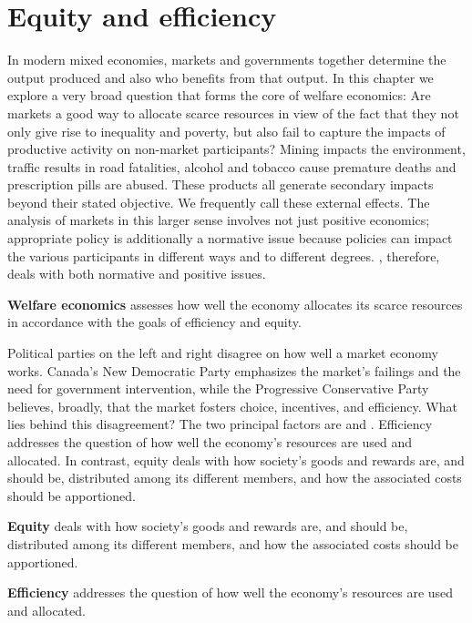 \section{Equity and efficiency}\label{sec:ch5sec1}

In modern mixed economies, markets and governments together determine the output produced and also who benefits from that output. In this chapter we explore a very broad question that forms the core of welfare economics: Are markets a good way to allocate scarce resources in view of the fact that they not only give rise to inequality and poverty, but also fail to capture the impacts of productive activity on non-market participants? Mining impacts the environment, traffic results in road fatalities, alcohol and tobacco cause premature deaths and prescription pills are abused. These products all generate secondary impacts beyond their stated objective. We frequently call these external effects. The analysis of markets in this larger sense involves not just positive economics; appropriate policy is additionally a normative issue because policies can impact the various participants in different ways and to different degrees. , therefore, deals with both normative and positive issues.

\begin{DefBox}
\textbf{Welfare economics} assesses how well the economy allocates its scarce resources in accordance with the goals of efficiency and equity.
\end{DefBox}

Political parties on the left and right disagree on how well a market economy works. Canada's New Democratic Party emphasizes the market's failings and the need for government intervention, while the Progressive Conservative Party believes, broadly, that the market fosters choice, incentives, and efficiency. What lies behind this disagreement? The two principal factors are  and . Efficiency addresses the question of how well the economy's resources are used and allocated. In contrast, equity deals with how society's goods and rewards are, and should be, distributed among its different members, and how the associated costs should be apportioned.

\begin{DefBox}
\textbf{Equity} deals with how society's goods and rewards are, and should be, distributed among its different members, and how the associated costs should be apportioned.

\textbf{Efficiency} addresses the question of how well the economy's resources are used and allocated.
\end{DefBox}

